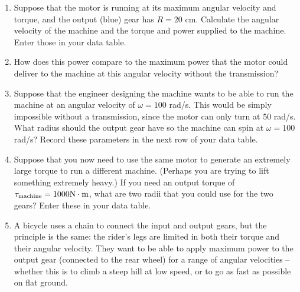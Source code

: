\documentclass[12pt]{article}
\begin{document}
\begin{enumerate}
\vspace{2in}

\item  Suppose that the motor is running at its maximum angular velocity and torque, and the output (blue) gear has $R=20$ cm. Calculate the angular velocity of the machine and the torque and power supplied to the machine. Enter those in your data table.


\item How does this power compare to the maximum power that the motor could deliver to the machine at this angular velocity without the transmission?


\vspace{1.5in}


\item Suppose that the engineer designing the machine wants to be able to run the machine at an angular velocity of $\omega = 100$ rad/s. This would be simply impossible without a transmission, since the motor can only turn at 50 rad/s. What radius should the output gear have so the machine can spin at $\omega = 100$ rad/s? Record these parameters in the next row of your data table.


\vspace{3in}


\item Suppose that you now need to use the same motor to generate an extremely large torque to run a different machine. (Perhaps you are trying to lift something extremely heavy.) If you need an output torque of $\tau_{\rm{machine}} = 1000 \rm N \cdot \rm m$, what are two radii that you could use for the two gears? Enter these in your data table.


\newpage


\item A bicycle uses a chain to connect the input and output gears, but the principle is the same: the rider's legs are limited in both their torque and their angular velocity. They want to be able to apply maximum power to the output gear (connected to the rear wheel) for a range of angular velocities -- whether this is to climb a steep hill at low speed, or to go as fast as possible on flat ground. 


\end{enumerate}
\end{document}
